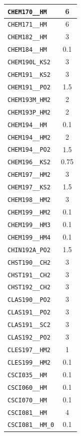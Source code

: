 \begin{longtable}{|p{}|c|}
    \verb|CHEM170__HM| & 6\\\hline
    \verb|CHEM171__HM| & 6\\\hline
    \verb|CHEM182__HM| & 3\\\hline
    \verb|CHEM184__HM| & 0.1\\\hline
    \verb|CHEM190L_KS2| & 3\\\hline
    \verb|CHEM191__KS2| & 3\\\hline
    \verb|CHEM191__PO2| & 1.5\\\hline
    \verb|CHEM193M_HM2| & 2\\\hline
    \verb|CHEM193P_HM2| & 2\\\hline
    \verb|CHEM194__HM| & 0.1\\\hline
    \verb|CHEM194__HM2| & 2\\\hline
    \verb|CHEM194__PO2| & 1.5\\\hline
    \verb|CHEM196__KS2| & 0.75\\\hline
    \verb|CHEM197__HM2| & 3\\\hline
    \verb|CHEM197__KS2| & 1.5\\\hline
    \verb|CHEM198__HM2| & 3\\\hline
    \verb|CHEM199__HM2| & 0.1\\\hline
    \verb|CHEM199__HM3| & 0.1\\\hline
    \verb|CHEM199__HM4| & 0.1\\\hline
    \verb|CHIN192A_PO2| & 1.5\\\hline
    \verb|CHST190__CH2| & 3\\\hline
    \verb|CHST191__CH2| & 3\\\hline
    \verb|CHST192__CH2| & 3\\\hline
    \verb|CLAS190__PO2| & 3\\\hline
    \verb|CLAS191__PO2| & 3\\\hline
    \verb|CLAS191__SC2| & 3\\\hline
    \verb|CLAS192__PO2| & 3\\\hline
    \verb|CLES197__HM2| & 1\\\hline
    \verb|CLES199__HM2| & 0.1\\\hline
    \verb|CSCI035__HM| & 0.1\\\hline
    \verb|CSCI060__HM| & 0.1\\\hline
    \verb|CSCI070__HM| & 0.1\\\hline
    \verb|CSCI081__HM| & 4\\\hline
    \verb|CSCI081__HM_0| & 0.1\\\hline

\end{longtable}
